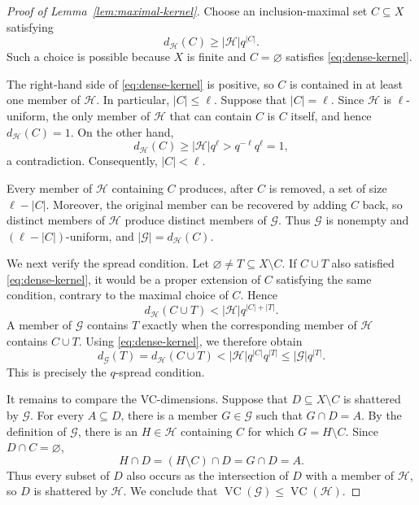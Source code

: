 \documentclass[11pt]{article}
\theoremstyle{definition}
\newcommand*{\abs}[1]{\lvert#1\rvert}
\newcommand{\cG}{\mathcal{G}}
\newcommand{\cH}{\mathcal{H}}
\newcommand{\VC}{\operatorname{VC}}
\begin{document}
\begin{proof}[Proof of Lemma~\ref{lem:maximal-kernel}]
Choose an inclusion-maximal set \(C\subseteq X\) satisfying
\begin{equation}\label{eq:dense-kernel}
d_{\cH}(C)\ge \abs{\cH}q^{\abs{C}}.
\end{equation}
Such a choice is possible because \(X\) is finite and \(C=\varnothing\) satisfies \eqref{eq:dense-kernel}.

The right-hand side of \eqref{eq:dense-kernel} is positive, so \(C\) is contained in at least one member of \(\cH\). In particular, \(\abs{C}\le\ell\). Suppose that \(\abs{C}=\ell\). Since \(\cH\) is \(\ell\)-uniform, the only member of \(\cH\) that can contain \(C\) is \(C\) itself, and hence \(d_{\cH}(C)=1\). On the other hand,
\[
d_{\cH}(C)\ge\abs{\cH}q^{\ell}>q^{-\ell}q^{\ell}=1,
\]
a contradiction. Consequently, \(\abs{C}<\ell\).

Every member of \(\cH\) containing \(C\) produces, after \(C\) is removed, a set of size \(\ell-\abs{C}\). Moreover, the original member can be recovered by adding \(C\) back, so distinct members of \(\cH\) produce distinct members of \(\cG\). Thus \(\cG\) is nonempty and \((\ell-\abs{C})\)-uniform, and
\(
\abs{\cG}=d_{\cH}(C).
\)

We next verify the spread condition. Let \(\varnothing\ne T\subseteq X\setminus C\). If \(C\cup T\) also satisfied \eqref{eq:dense-kernel}, it would be a proper extension of \(C\) satisfying the same condition, contrary to the maximal choice of \(C\). Hence
\[
d_{\cH}(C\cup T)<\abs{\cH}q^{\abs{C}+\abs{T}}.
\]
A member of \(\cG\) contains \(T\) exactly when the corresponding member of \(\cH\) contains \(C\cup T\). Using \eqref{eq:dense-kernel}, we therefore obtain
\[
d_{\cG}(T)=d_{\cH}(C\cup T)
<\abs{\cH}q^{\abs{C}}q^{\abs{T}}
\le\abs{\cG}q^{\abs{T}}.
\]
This is precisely the \(q\)-spread condition.

It remains to compare the VC-dimensions. Suppose that \(D\subseteq X\setminus C\) is shattered by \(\cG\). For every \(A\subseteq D\), there is a member \(G\in\cG\) such that \(G\cap D=A\). By the definition of \(\cG\), there is an \(H\in\cH\) containing \(C\) for which \(G=H\setminus C\). Since \(D\cap C=\varnothing\),
\[
H\cap D=(H\setminus C)\cap D=G\cap D=A.
\]
Thus every subset of \(D\) also occurs as the intersection of \(D\) with a member of \(\cH\), so \(D\) is shattered by \(\cH\). We conclude that \(\VC(\cG)\le\VC(\cH)\).
\end{proof}
\end{document}
